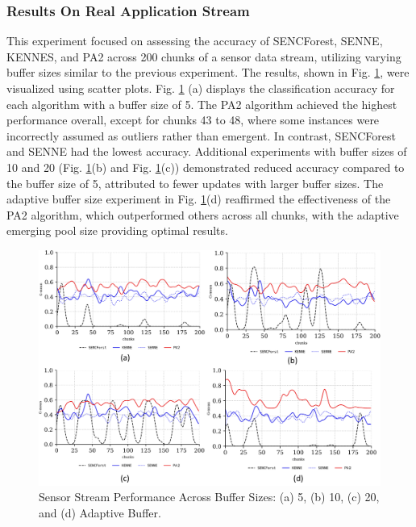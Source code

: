 \subsubsection{Results On Real Application Stream}
\label{sec:sensor}
This experiment focused on assessing the accuracy of SENCForest, SENNE, KENNES, and PA2 across 200 chunks of a sensor data stream, utilizing varying buffer sizes similar to the previous experiment. The results, shown in Fig. \ref{fig:res2}, were visualized using scatter plots. Fig. \ref{fig:res2} (a) displays the classification accuracy for each algorithm with a buffer size of 5. The PA2 algorithm achieved the highest performance overall, except for chunks 43 to 48, where some instances were incorrectly assumed as outliers rather than emergent. In contrast, SENCForest and SENNE had the lowest accuracy. Additional experiments with buffer sizes of 10 and 20 (Fig. \ref{fig:res2}(b) and Fig. \ref{fig:res2}(c)) demonstrated reduced accuracy compared to the buffer size of 5, attributed to fewer updates with larger buffer sizes. The adaptive buffer size experiment in Fig. \ref{fig:res2}(d) reaffirmed the effectiveness of the PA2 algorithm, which outperformed others across all chunks, with the adaptive emerging pool size providing optimal results.

\begin{figure}[!ht]
	\centering
	\includegraphics[width=1\linewidth]{5_Emerging/images/res2.png}
	\caption{Sensor Stream Performance Across Buffer Sizes: (a) 5, (b) 10, (c) 20, and (d) Adaptive Buffer.}

	\label{fig:res2}
\end{figure}				

